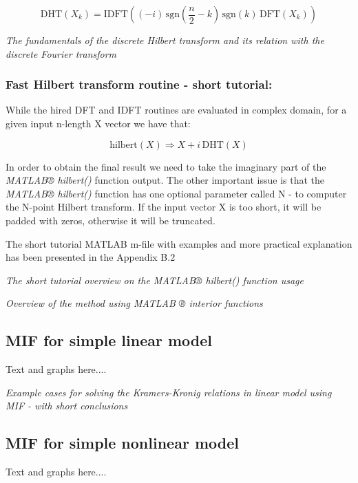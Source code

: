 \documentclass[12pt,twoside,a4paper]{article}
\numberwithin{equation}{subsection}
\numberwithin{figure}{subsection}
\begin{document}
\begin{equation} \label{eq:matlab_fulldhthdf}
  \mathrm{DHT}({X_{k}})=\mathrm{IDFT}(( - i)\,\mathrm{sgn}(\frac {n}{2} - k)\,\mathrm{sgn}(k)\,\mathrm{DFT}({X_{k}}))
\end{equation}

\textit{The fundamentals of the discrete Hilbert transform and its relation with the discrete Fourier transform}

\subsubsection*{Fast Hilbert transform routine - short tutorial:}

While the hired DFT and IDFT routines are evaluated in complex domain, for a given input n-length X vector we have that:

\begin{equation} \label{eq:matlab_implication}
  \mathrm{hilbert}(X) \Rightarrow X + i\,\mathrm{DHT}(X)
\end{equation}

In order to obtain the final result we need to take the imaginary part of the \textit{MATLAB® hilbert() }function output. The other
important issue is that the \textit{MATLAB® hilbert()} function has one optional parameter called N - to computer the N-point Hilbert transform. If the input vector X is too short, it will be padded with zeros, otherwise it will be truncated.

The short tutorial MATLAB m-file with examples and more practical explanation has been presented in the Appendix B.2

\textit{The short tutorial overview on the MATLAB® hilbert() function usage}

\textit{Overview of the method using MATLAB ® interior functions}

\subsection{MIF for simple linear model} \label{chap:matlab_lin}

Text and graphs here.... 

\textit{Example cases for solving the Kramers-Kronig relations in linear model using MIF - with short conclusions}

\subsection{MIF for simple nonlinear model} \label{chap:matlab_nlo}
Text and graphs here.... 
\end{document}
